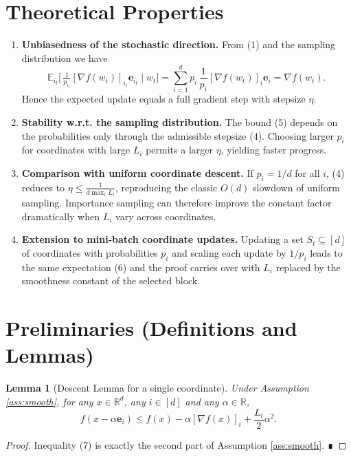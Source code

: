 \documentclass{article}
\newtheorem{lemma}{Lemma}
\newcommand{\EE}{\mathbb{E}}
\newcommand{\R}{\mathbb{R}}
\newcommand{\e}{\mathbf{e}}
\begin{document}
\section*{Theoretical Properties}
\begin{enumerate}[label=\arabic*)]
\item \textbf{Unbiasedness of the stochastic direction.}
    From (1) and the sampling distribution we have
    \[
    \EE_{i_t}\!\bigl[\,\tfrac{1}{p_{i_t}}[\nabla f(w_t)]_{i_t}\e_{i_t}\mid w_t\bigr]
    =\sum_{i=1}^{d}p_i\,\frac{1}{p_i}[\nabla f(w_t)]_i\e_i
    =\nabla f(w_t).
    \tag{6}
    \]
    Hence the expected update equals a full gradient step with stepsize
    $\eta$.

\item \textbf{Stability w.r.t. the sampling distribution.}
    The bound (5) depends on the probabilities only through the
    admissible stepsize (4). Choosing larger $p_i$ for coordinates with
    large $L_i$ permits a larger $\eta$, yielding faster progress.

\item \textbf{Comparison with uniform coordinate descent.}
    If $p_i=1/d$ for all $i$, (4) reduces to $\eta\le \frac{1}{d\max_i L_i}$,
    reproducing the classic $O(d)$ slowdown of uniform sampling.
    Importance sampling can therefore improve the constant factor
    dramatically when $L_i$ vary across coordinates.

\item \textbf{Extension to mini‑batch coordinate updates.}
    Updating a set $S_t\subseteq[d]$ of coordinates with probabilities
    $p_i$ and scaling each update by $1/p_i$ leads to the same
    expectation (6) and the proof carries over with $L_i$ replaced by
    the smoothness constant of the selected block.
\end{enumerate}

\section*{Preliminaries (Definitions and Lemmas)}
\begin{lemma}[Descent Lemma for a single coordinate]\label{lem:descent}
Under Assumption \ref{ass:smooth}, for any $x\in\R^{d}$, any $i\in[d]$ and any
$\alpha\in\R$,
\[
f(x-\alpha \e_i)\le f(x)-\alpha [\nabla f(x)]_i
+\frac{L_i}{2}\alpha^{2}.
\tag{7}
\]
\end{lemma}
\begin{proof}
Inequality (7) is exactly the second part of Assumption
\ref{ass:smooth}. ∎
\end{proof}
\end{document}
